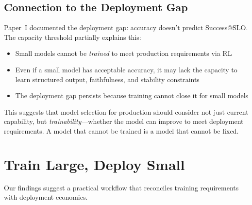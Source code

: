 \documentclass[11pt]{article}
\begin{document}
\subsection{Connection to the Deployment Gap}

Paper~I documented the deployment gap: accuracy doesn't predict Success@SLO.
The capacity threshold partially explains this:

\begin{itemize}[leftmargin=12pt]
    \item Small models cannot be \emph{trained} to meet production requirements via RL
    \item Even if a small model has acceptable accuracy, it may lack the capacity to learn structured output, faithfulness, and stability constraints
    \item The deployment gap persists because training cannot close it for small models
\end{itemize}

This suggests that model selection for production should consider not just current capability, but \emph{trainability}---whether the model can improve to meet deployment requirements.
A model that cannot be trained is a model that cannot be fixed.

\section{Train Large, Deploy Small}
\label{sec:pipeline}

Our findings suggest a practical workflow that reconciles training requirements with deployment economics.
\end{document}

